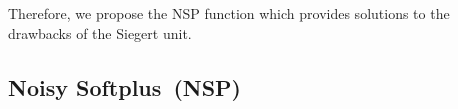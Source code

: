 	Therefore, we propose the NSP function which provides solutions to the drawbacks of the Siegert unit.

		
	\subsection{Noisy Softplus~(NSP)}
	\label{sec:NSP}
